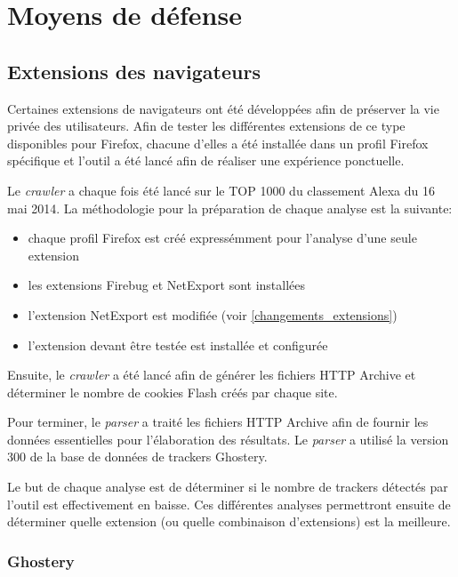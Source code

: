 \chapter{Moyens de défense}
\section{Extensions des navigateurs}
Certaines extensions de navigateurs ont été développées afin de préserver la vie privée des utilisateurs.
Afin de tester les différentes extensions de ce type disponibles pour Firefox, chacune d'elles a été installée dans un profil Firefox spécifique et l'outil a été lancé afin de réaliser une expérience ponctuelle.
\newline

Le \textit{crawler} a chaque fois été lancé sur le TOP 1000 du classement Alexa \cite{AlexaTop} du 16 mai 2014. La méthodologie pour la préparation de chaque analyse est la suivante:
\begin{itemize}
  \item chaque profil Firefox est créé expressémment pour l'analyse d'une seule extension
  \item les extensions Firebug et NetExport sont installées
  \item l'extension NetExport est modifiée (voir \autoref{changements_extensions})
  \item l'extension devant être testée est installée et configurée
  \newline
\end{itemize}

Ensuite, le \textit{crawler} a été lancé afin de générer les fichiers HTTP Archive et déterminer le nombre de cookies Flash créés par chaque site.
\newline

Pour terminer, le \textit{parser} a traité les fichiers HTTP Archive afin de fournir les données essentielles pour l'élaboration des résultats. Le \textit{parser} a utilisé la version 300 de la base de données de trackers Ghostery.
\newline

Le but de chaque analyse est de déterminer si le nombre de trackers détectés par l'outil est effectivement en baisse. Ces différentes analyses permettront ensuite de déterminer quelle extension (ou quelle combinaison d'extensions) est la meilleure.

\subsection{Ghostery}
